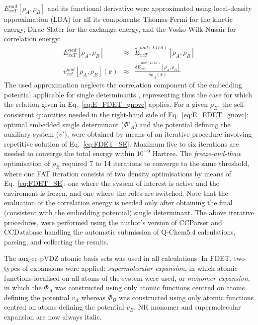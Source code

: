 \documentclass[journal=jctcce,manuscript=article]{achemso}
\newcommand{\nr}[1]{\color{red}#1\color{black}}
\begin{document}
$E_{xcT}^{nad}[\rho_A,\rho_B]$ and its functional derivative \nr{were } approximated using local-density approximation (LDA) for all its components: Thomas-Fermi  \cite{Thomas1927, Fermi1928} for the kinetic energy, Dirac-Slater\cite{Slater1929} for the exchange energy, and the Vosko-Wilk-Nusair \cite{Vosko1980} for correlation energy:
\begin{eqnarray}
{E}_{xcT}^{nad}[\rho_A,\rho_B]&\approx& \tilde {E}_{xcT}^{nad(LDA)}[\rho_A,\rho_B] \\
v_{xct}^{nad}[\rho_A,\rho_B](\mathbf{r})&\approx&\frac{\delta \tilde{E}_{xct}^{nad(LDA)}[\rho_A,\rho_B]}{\delta\rho_A(\mathbf{r})}
\end{eqnarray}
The used approximation neglect\nr{s } the correlation component of the embedding potential applicable for single determinants \cite{Wesolowski2008}, representing thus the case for which the relation given in Eq.~\ref{eq:E_FDET_gnovc} applies. 
For a given $\rho_B$, the self-consistent quantities needed in the right-hand side of Eq.~\ref{eq:E_FDET_gnovc}: 
optimal embedded single determinant ($\Phi'_A$) and the potential defining the auxiliary system ($v'$), 
were obtained by means of an iterative procedure involving repetitive solution of Eq.~\ref{eq:FDET_SE}. 
Maximum five to six iterations are needed to converge the total energy within $10^{-9}$ Hartree. 
The \textit{freeze-and-thaw} optimisation of $\rho_B$ required 7 to 14 iterations to converge to the same threshold, where one FAT iteration \nr{consists of two density optimisations by means of Eq.~\ref{eq:FDET_SE}: one where the system of interest is active and the enviroment is frozen, and one where the roles are switched. }
Note that the evaluation of the correlation energy is needed only after obtaining the final (consistent with the embedding potential) single determinant. 
The above iterative procedures, %
were performed using the author's version \cite{CCParser_Ricardi} of CCParser\cite{CCParser_Zech} and CCDatabase\cite{CCDatabase} handling the automatic submission of Q-Chem5.4\cite{Qchem54} calculations, parsing, and collecting the results.

The aug-cc-pVDZ \nr{atomic basis sets was } used in all calculations. 
In FDET, two types of expansions were applied: {\it supermolecular expansion}, in which atomic functions localised on all atoms of the system were used, or {\it monomer expansion}, in which the $\Phi_A$ was constructed using only 
atomic functions centred on atoms defining the potential $v_A$ whereas $\Phi_B$ was constructed using only atomic functions centred on atoms defining the potential $v_B$. \nr{NR monomer and supermolecular expansion are now always italic. }
\end{document}
